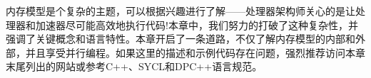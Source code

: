 内存模型是个复杂的主题，可以根据兴趣进行了解——处理器架构师关心的是让处理器和加速器尽可能高效地执行代码!本章中，我们努力的打破了这种复杂性，并强调了关键概念和语言特性。本章开启了一条道路，不仅了解内存模型的内部和外部，并且享受并行编程。如果这里的描述和示例代码存在问题，强烈推荐访问本章末尾列出的网站或参考C++、SYCL和DPC++语言规范。\par














































